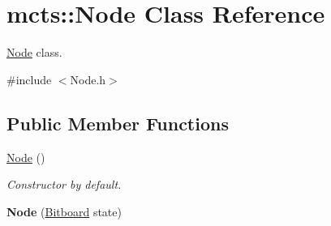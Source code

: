 \hypertarget{classmcts_1_1_node}{\section{mcts\+:\+:Node Class Reference}
\label{classmcts_1_1_node}
}


\hyperlink{classmcts_1_1_node}{Node} class.  




{\ttfamily \#include $<$Node.\+h$>$}

\subsection*{Public Member Functions}
\begin{DoxyCompactItemize}
\item 
\hypertarget{classmcts_1_1_node_a5fb90d28e126f4e432b2cc3721bd357a}{\hyperlink{classmcts_1_1_node_a5fb90d28e126f4e432b2cc3721bd357a}{Node} ()}\label{classmcts_1_1_node_a5fb90d28e126f4e432b2cc3721bd357a}

\begin{DoxyCompactList}\small\item\em Constructor by default. \end{DoxyCompactList}\item 
\hypertarget{classmcts_1_1_node_ac23152a7993365712024e8a7565c4301}{{\bfseries Node} (\hyperlink{class_bitboard}{Bitboard} state)}\label{classmcts_1_1_node_ac23152a7993365712024e8a7565c4301}


\end{DoxyCompactItemize}
